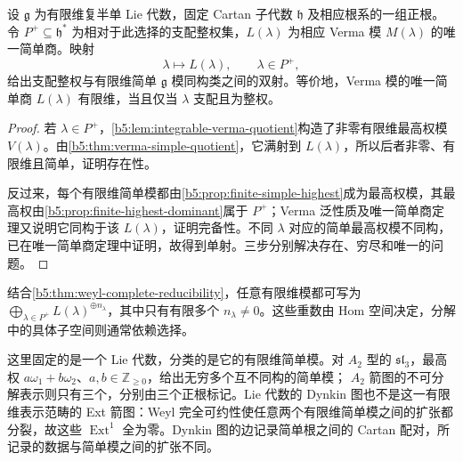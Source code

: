 \begin{theorem}[最高权分类]\label{b5:thm:highest-weight-classification}
	设 \(\mathfrak g\) 为有限维复半单 Lie 代数，固定 Cartan 子代数 \(\mathfrak h\) 及相应根系的一组正根。令 \(P^+\subseteq\mathfrak h^*\) 为相对于此选择的支配整权集，\(L(\lambda)\) 为相应 Verma 模 \(M(\lambda)\) 的唯一简单商。映射
	\[
		\lambda\longmapsto L(\lambda),\qquad\lambda\in P^+,
	\]
	给出支配整权与有限维简单 \(\mathfrak g\) 模同构类之间的双射。等价地，Verma 模的唯一简单商 \(L(\lambda)\) 有限维，当且仅当 \(\lambda\) 支配且为整权。
\end{theorem}
\begin{proof}
	若 \(\lambda\in P^+\)，\cref{b5:lem:integrable-verma-quotient}构造了非零有限维最高权模 \(V(\lambda)\)。由\cref{b5:thm:verma-simple-quotient}，它满射到 \(L(\lambda)\)，所以后者非零、有限维且简单，证明存在性。

	反过来，每个有限维简单模都由\cref{b5:prop:finite-simple-highest}成为最高权模，其最高权由\cref{b5:prop:finite-highest-dominant}属于 \(P^+\)；Verma 泛性质及唯一简单商定理又说明它同构于该 \(L(\lambda)\)，证明完备性。不同 \(\lambda\) 对应的简单最高权模不同构，已在唯一简单商定理中证明，故得到单射。三步分别解决存在、穷尽和唯一的问题。
\end{proof}

结合\cref{b5:thm:weyl-complete-reducibility}，任意有限维模都可写为 \(\bigoplus_{\lambda\in P^+}L(\lambda)^{\oplus n_\lambda}\)，其中只有有限多个 \(n_\lambda\ne0\)。这些重数由 Hom 空间决定，分解中的具体子空间则通常依赖选择。

\ProseParagraphBreak

这里固定的是一个 Lie 代数，分类的是它的有限维简单模。对 \(A_2\) 型的 \(\mathfrak{sl}_3\)，最高权 \(a\omega_1+b\omega_2\)、\(a,b\in\mathbb Z_{\ge0}\)，给出无穷多个互不同构的简单模； \(A_2\) 箭图的不可分解表示则只有三个，分别由三个正根标记。Lie 代数的 Dynkin 图也不是这一有限维表示范畴的 Ext 箭图：Weyl 完全可约性使任意两个有限维简单模之间的扩张都分裂，故这些 \(\operatorname{Ext}^1\) 全为零。Dynkin 图的边记录简单根之间的 Cartan 配对，所记录的数据与简单模之间的扩张不同。

